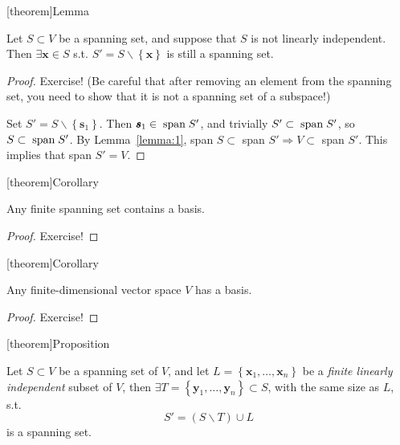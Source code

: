 \documentclass[12pt]{report}
\theoremstyle{definition}
\begin{document}
[theorem]{Lemma}
\begin{linearly dependent spanning set removed an element to be linearly independent}
    Let $S \subset V$ be a spanning set, and suppose that $S$ is not linearly independent.
    Then $\exists \pmb{x}\in S$ s.t. $S' = S\backslash\left\{\pmb{x}\right\} $ is still a spanning set.
\end{linearly dependent spanning set removed an element to be linearly independent}

\begin{proof}
    Exercise!
    (Be careful that after removing an element from the spanning set,
    you need to show that it is not a spanning set of a subspace!)
    
    Set $S' = S \backslash\left\{\pmb{s}_1\right\} $. Then $\pmb{s}_1 \in \;\textnormal{span}\;{S'}$,
    and trivially $S' \subset \;\textnormal{span}\;{S'}$, so $S \subset \;\textnormal{span}\;{S'}$.
    By Lemma~\ref{lemma:1}, span $S \subset$ span $S' \Rightarrow{} V \subset$ span $S'$.
    This implies that span $S' = V$.
\end{proof}

[theorem]{Corollary}
\begin{any finite spanning set contains a basis}
    Any finite spanning set contains a basis.
\end{any finite spanning set contains a basis}

\begin{proof}
    Exercise!
\end{proof}

[theorem]{Corollary}
\begin{any finite-dimensional v has a basis}
Any finite-dimensional vector space $V$ has a basis.
\end{any finite-dimensional v has a basis}

\begin{proof}
    Exercise!
\end{proof}

[theorem]{Proposition}
\begin{Steinitz exchange lemma}
Let $S \subset V$ be a spanning set of $V$, and let $L = \left\{\pmb{x}_1, \ldots, \pmb{x}_n\right\} $
be a \emph{finite linearly independent} subset of $V$, then 
$\exists T = \left\{\pmb{y}_1,\ldots,\pmb{y}_n\right\} \subset S$, with the same size as $L$, s.t.\[
    S' = (S\backslash T)\cup L
\]is a spanning set.
\end{Steinitz exchange lemma}
\end{document}
